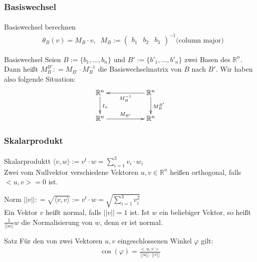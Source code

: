 \documentclass{beamer}
\begin{document}
\begin{frame}
    \frametitle{Basiswechsel}
\framesubtitle{}
\begin{block}{Basiswechsel berechnen}
\begin{eqnarray*}
& \theta_B(v) =  M_B \cdot v, \; \; M_B :=  \begin{pmatrix}
 b_1 & b_2 &  b_3
\end{pmatrix}^{-1} \text{(column major)}
\end{eqnarray*}
\end{block}

\begin{block}{Basiswechsel}
Seien $B:= \{ b_1, \hdots , b_n \}$ und $B':= \{ b'_1, \hdots , b'_n \}$ zwei Basen des $\mathbb{R}^n$.
Dann heißt $M_{B}^{B'} : = M_{B'}  \cdot M_{B}^{-1} $ die Basiswechselmatrix von $B$ nach $B'$. Wir haben also folgende Situation:
\begin{align*}
\xymatrix{
\mathbb{R}^n  \ar[d]^{I_n} &  & \ar[ll]^{M_B^{-1}} \mathbb{R}^n \ar[d]^{M_{B}^{B'}} \\
\mathbb{R}^n  \ar[rr]^{M_{B'}} & &  \mathbb{R}^n
}
\end{align*}
\end{block}
\end{frame}


\begin{frame}
    \frametitle{Skalarprodukt}
\framesubtitle{}
\begin{block}{Skalarproduktt}
$\langle v ,w \rangle := v^t \cdot w = \sum_{i=1}^{3} v_i \cdot w_i$ \\
Zwei vom Nullvektor verschiedene Vektoren $u,v \in \mathbb{R}^n$ heißen orthogonal, falls $<u,v> = 0$ ist. 
\end{block}
\begin{block}{Norm}
$||v || : = \sqrt{\langle v ,v \rangle} := v^t \cdot w = \sqrt{\sum_{i=1}^{3} v_i ^{2}}$ \\
Ein Vektor $v$ heißt normal, falls $||v|| = 1$ ist.
Ist $w$ ein beliebiger Vektor, so heißt $\frac{1}{||w||} w$ die Normalisierung von $w$, denn er ist normal.
\end{block}
\begin{block}{Satz}
Für den von zwei Vektoren $u,v$ eingeschlossenen Winkel $\varphi$ gilt:
\begin{align*}
\cos(\varphi) = \frac{<u,v>}{||u|| \cdot ||v||}
\end{align*}
\end{block}
\end{frame}
\end{document}
